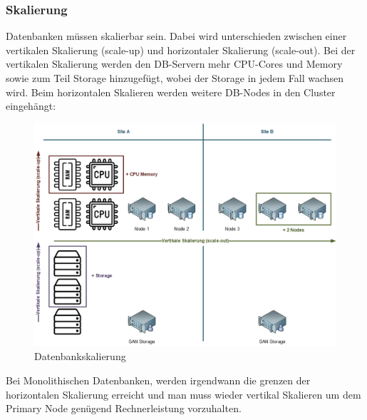 
\subsubsection{Skalierung}
Datenbanken müssen skalierbar sein.
Dabei wird unterschieden zwischen einer vertikalen Skalierung (scale-up) und horizontaler Skalierung (scale-out).
Bei der vertikalen Skalierung werden den DB-Servern mehr CPU-Cores und Memory sowie zum Teil Storage hinzugefügt, wobei der Storage in jedem Fall wachsen wird.
Beim horizontalen Skalieren werden weitere DB-Nodes in den Cluster eingehängt\cite{IZSGZLVT}:
\begin{figure}[H]
    \centering
    \includegraphics[width=1\linewidth]{source/implementation/evaluation/excursus_architecture/Skalierung}
    \caption{Datenbankskalierung}
    \label{fig:Datenbankskalierung}
\end{figure}

Bei Monolithischen Datenbanken, werden irgendwann die grenzen der horizontalen Skalierung erreicht und man muss wieder vertikal Skalieren um dem Primary Node genügend Rechnerleistung vorzuhalten.